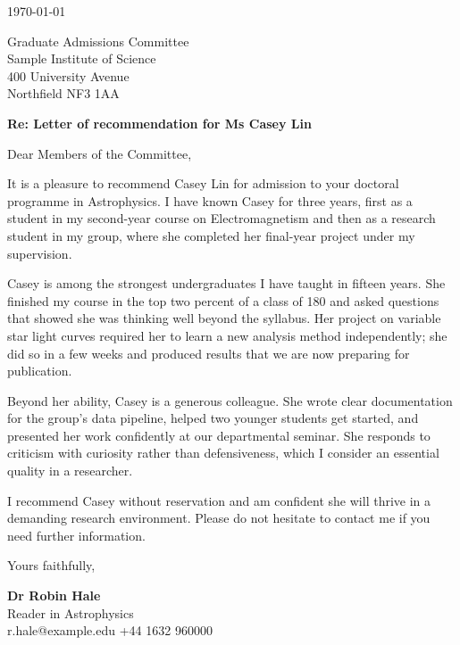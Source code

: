 \documentclass[11pt]{article}
\begin{document}
\thispagestyle{letterhead}
\pagestyle{plain}

\hfill\today

Graduate Admissions Committee\\
Sample Institute of Science\\
400 University Avenue\\
Northfield NF3 1AA

\textbf{Re: Letter of recommendation for Ms Casey Lin}

Dear Members of the Committee,

It is a pleasure to recommend Casey Lin for admission to your doctoral programme in Astrophysics. I have known Casey for three years, first as a student in my second-year course on Electromagnetism and then as a research student in my group, where she completed her final-year project under my supervision.

Casey is among the strongest undergraduates I have taught in fifteen years. She finished my course in the top two percent of a class of 180 and asked questions that showed she was thinking well beyond the syllabus. Her project on variable star light curves required her to learn a new analysis method independently; she did so in a few weeks and produced results that we are now preparing for publication.

Beyond her ability, Casey is a generous colleague. She wrote clear documentation for the group's data pipeline, helped two younger students get started, and presented her work confidently at our departmental seminar. She responds to criticism with curiosity rather than defensiveness, which I consider an essential quality in a researcher.

I recommend Casey without reservation and am confident she will thrive in a demanding research environment. Please do not hesitate to contact me if you need further information.

Yours faithfully,

\vspace{0.6em}

\textbf{Dr Robin Hale}\\
Reader in Astrophysics\\
r.hale@example.edu \quad +44 1632 960000
\end{document}
